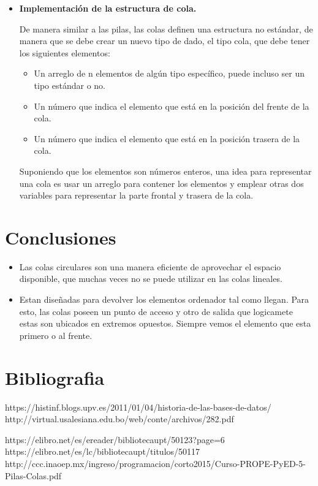 \documentclass[twoside,twocolumn]{article}
\begin{document}
\begin{itemize}
		
		\item \textbf{Implementación de la estructura de cola.}
		
		De manera similar a las pilas, las colas definen una estructura no estándar, de manera que se debe crear un nuevo tipo de dado, el tipo cola, que debe tener los siguientes elementos: \\
		
		\begin{itemize}
			\item Un arreglo de n elementos de algún tipo específico, puede incluso ser un tipo estándar o no. 
			\item Un número que indica el elemento que está en la posición del frente de la cola. 
			\item Un número que indica el elemento que está en la posición trasera de la cola.
		\end{itemize}
		
		Suponiendo que los elementos son números enteros, una idea para representar una cola es usar un arreglo para contener los elementos y emplear otras dos variables para representar la parte frontal y trasera de la cola.\\
		
	\end{itemize}
	
	
	\section{Conclusiones }
	
	\begin{itemize}
		\item Las colas circulares son una manera eficiente de aprovechar el espacio disponible, que muchas veces no se puede utilizar en las colas lineales. 
		\item Estan diseñadas para devolver los elementos ordenador tal como llegan. Para esto, las colas poseen un punto de acceso y otro de salida que logicamete estas son ubicados en extremos opuestos. Siempre vemos el elemento que esta primero o al frente.
	\end{itemize}
	
	
	
	

	\section{Bibliografia}
	
	
	https://histinf.blogs.upv.es/2011/01/04/historia-de-las-bases-de-datos/ 
	http://virtual.usalesiana.edu.bo/web/conte/archivos/282.pdf 

	https://elibro.net/es/ereader/bibliotecaupt/50123?page=6
	https://elibro.net/es/lc/bibliotecaupt/titulos/50117
	http://ccc.inaoep.mx/ingreso/programacion/corto2015/Curso-PROPE-PyED-5-Pilas-Colas.pdf
\end{document}
